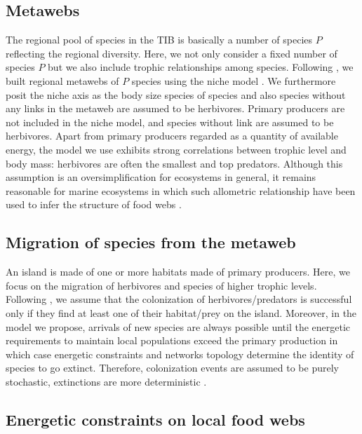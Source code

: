 \subsection{Metawebs}\label{metawebs}

The regional pool of species in the TIB is basically a number of species
\(P\) reflecting the regional diversity. Here, we not only consider a
fixed number of species \(P\) but we also include trophic relationships
among species. Following \citet{Cazelles2015a}, we built regional
metawebs of \(P\) species using the niche model \citet{Williams2000}. We
furthermore posit the niche axis as the body size species of species and
also species without any links in the metaweb are assumed to be
herbivores. Primary producers are not included in the niche model, and
species without link are assumed to be herbivores. Apart from primary
producers regarded as a quantity of available energy, the model we use
exhibits strong correlations between trophic level and body mass:
herbivores are often the smallest and top predators. Although this
assumption is an oversimplification for ecosystems in general, it
remains reasonable for marine ecosystems \citep{Trebilco2013} in which
such allometric relationship have been used to infer the structure of
food webs \citep{Gravel2013}.

\subsection{Migration of species from the
metaweb}\label{migration-of-species-from-the-metaweb}

An island is made of one or more habitats made of primary producers.
Here, we focus on the migration of herbivores and species of higher
trophic levels. Following \citet{Gravel2011}, we assume that the
colonization of herbivores/predators is successful only if they find at
least one of their habitat/prey on the island. Moreover, in the model we
propose, arrivals of new species are always possible until the energetic
requirements to maintain local populations exceed the primary production
in which case energetic constraints and networks topology determine the
identity of species to go extinct. Therefore, colonization events are
assumed to be purely stochastic, extinctions are more deterministic
\citep[this difference in stochastic nature between these fundamental
processes of biogeography has been recently supported
in][]{Cirtwill2015}.

\subsection{Energetic constraints on local food
webs}\label{energetic-constraints-on-local-food-webs}

